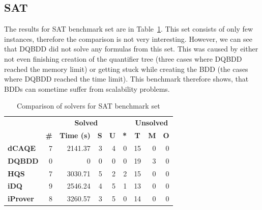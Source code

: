 \documentclass[
  digital, %
  color,
  twoside, %
  table,   %
  nolof,     %
  nolot,     %
]{fithesis3}
\theoremstyle{definition}
\theoremstyle{remark}
\begin{document}
\subsection{SAT}
The results for SAT benchmark set are in Table~\ref{tab:SAT}. This set consists of only few instances, therefore the comparison is not very interesting. However, we can see that DQBDD did not solve any formulas from this set. This was caused by either not even finishing creation of the quantifier tree (three cases where DQBDD reached the memory limit) or getting stuck while creating the BDD (the cases where DQBDD reached the time limit). This benchmark therefore shows, that BDDs can sometime suffer from scalability problems.

\begin{table}[ht]
\centering
\caption{Comparison of solvers for SAT benchmark set}%
\label{tab:SAT}
\begin{tabular}{|l|r|r|r|r|r|r|r|r|}
\hline
\multicolumn{1}{|c|}{}                                  & \multicolumn{5}{c|}{\textbf{Solved}}                                                                                                                                        & \multicolumn{3}{c|}{\textbf{Unsolved}}                                                                 \\  \hhline{~*{8}{-}}
\multicolumn{1}{|c|}{\multirow{-2}{*}{\textbf{Solver}}} & \multicolumn{1}{c|}{\textbf{\#}} & \multicolumn{1}{c|}{\textbf{Time (s)}} & \multicolumn{1}{c|}{\textbf{S}} & \multicolumn{1}{c|}{\textbf{U}} & \multicolumn{1}{c|}{\textbf{*}} & \multicolumn{1}{c|}{\textbf{T}} & \multicolumn{1}{c|}{\textbf{M}} & \multicolumn{1}{c|}{\textbf{O}} \\ \hline
\textbf{dCAQE} & \num{7} & \num{2141.37} & \num{3} & \num{4} & \num{0} & \num{15} & \num{0} & \num{0} \\ \hline
\textbf{DQBDD} & \num{0} & \num{0} & \num{0} & \num{0} & \num{0} & \num{19} & \num{3} & \num{0} \\ \hline
\textbf{HQS} & \num{7} & \num{3030.71} & \num{5} & \num{2} & \num{2} & \num{15} & \num{0} & \num{0} \\ \hline
\textbf{iDQ} & \num{9} & \num{2546.24} & \num{4} & \num{5} & \num{1} & \num{13} & \num{0} & \num{0} \\ \hline
\textbf{iProver} & \num{8} & \num{3260.57} & \num{3} & \num{5} & \num{0} & \num{14} & \num{0} & \num{0} \\ \hline
\end{tabular}
\end{table}
\end{document}
